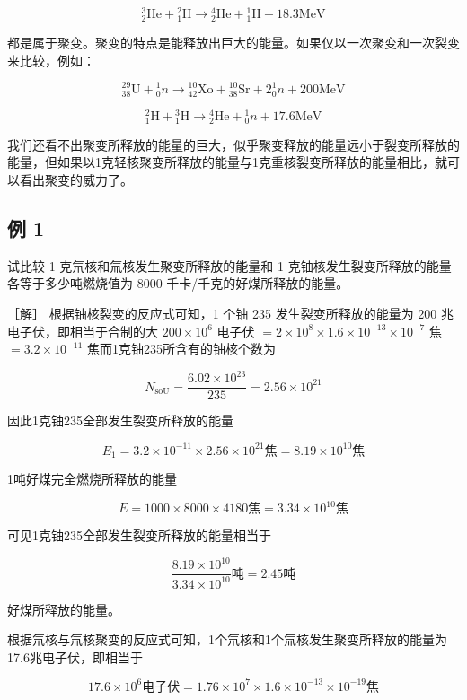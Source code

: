 \[
{ } _ { 2 } ^ { 3 } \mathrm{He} + { } _ { 1 } ^ { 2 } \mathrm{H} \longrightarrow { } _ { 2 } ^ { 4 } \mathrm{He} + { } _ { 1 } ^ { 1 } \mathrm{H} + 18.3 \mathrm{MeV}
\]

都是属于聚变。聚变的特点是能释放出巨大的能量。如果仅以一次聚变和一次裂变来比较，例如：

\[
{ } _ { 38 } ^ { 29 } \mathrm{U} + { } _ { 0 } ^ { 1 } n \longrightarrow { } _ { 42 } ^ { 10 } \mathrm{Xo} + { } _ { 38 } ^ { 10 } \mathrm{Sr} + 2 { } _ { 0 } ^ { 1 } n + 200 \mathrm{MeV}
\]

\[
{ } _ {1}^{2}\mathrm{H}+{ } _ {1}^{3}\mathrm{H}\longrightarrow { } _ {2}^{4}\mathrm{He}+{ } _ {0}^{1}n+17.6\mathrm{MeV}
\]

我们还看不出聚变所释放的能量的巨大，似乎聚变释放的能量远小于裂变所释放的能量，但如果以1克轻核聚变所释放的能量与1克重核裂变所释放的能量相比，就可以看出聚变的威力了。

\subsection{例 1}

试比较 1 克氘核和氚核发生聚变所释放的能量和 1
克铀核发生裂变所释放的能量各等于多少吨燃烧值为 8000
千卡/千克的好煤所释放的能量。

［解］ 根据铀核裂变的反应式可知，1 个铀 235 发生裂变所释放的能量为 200
兆电子伏，即相当于合制的大 \(200 \times 10^{6}\) 电子伏
\(= 2 \times 10^{8} \times 1.6 \times 10^{-13} \times 10^{-7}\)
焦\(= 3.2 \times 10^{-11}\) 焦而1克铀235所含有的铀核个数为

\[
N _ {\mathrm{soU}} = \frac {6.02 \times 10 ^ {23}}{235} = 2.56 \times 10 ^ {21}
\]

因此1克铀235全部发生裂变所释放的能量

\[
E _ {1} = 3.2 \times 10 ^ {- 11} \times 2.56 \times 10 ^ {21} \text{焦} = 8.19 \times 10 ^ {10} \text{焦}
\]

1吨好煤完全燃烧所释放的能量

\[
E = 1000 \times 8000 \times 4180 \text{焦} = 3.34 \times 10 ^ {10} \text{焦}
\]

可见1克铀235全部发生裂变所释放的能量相当于

\[
\frac {8.19 \times 10 ^ {10}}{3.34 \times 10 ^ {10}} \text{吨} = 2.45 \text{吨}
\]

好煤所释放的能量。

根据氘核与氚核聚变的反应式可知，1个氘核和1个氚核发生聚变所释放的能量为17.6兆电子伏，即相当于

\[
17.6 \times 10 ^ {6} \text{电子伏} = 1.76 \times 10 ^ {7} \times 1.6 \times 10 ^ {- 13} \times 10 ^ {- 19} \text{焦}
\]

